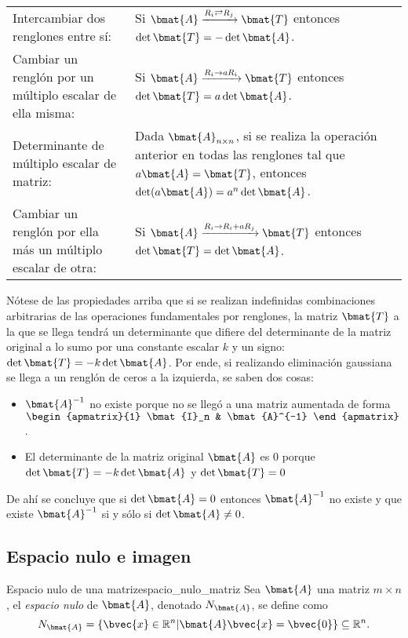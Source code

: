 \documentclass{fmbnotes}
\begin{document}
\begin{tabular}{p{}p{}}
	\rule[1ex]{0pt}{2.5ex}Intercambiar dos renglones entre sí: & Si \(\bmat{A}\xrightarrow{R_i \rightleftarrows R_j}\bmat{T}\) entonces \(\det \bmat{T}=-\det \bmat{A}\).\\
	\rule[1ex]{0pt}{2.5ex}Cambiar un renglón por un múltiplo escalar de ella misma: &  Si \(\bmat{A}\xrightarrow{R_i \to aR_i}\bmat{T}\) entonces \(\det \bmat{T}=a\det \bmat{A}\).  \\
	\rule[1ex]{0pt}{2.5ex}Determinante de múltiplo escalar de matriz: &  Dada \(\bmat{A}_{n \times n}\), si se realiza la operación anterior en todas las renglones tal que \(a\bmat{A}=\bmat{T}\), entonces \(\det (a\bmat{A})=a^{n} \det \bmat{A}\).  \\
	\rule[1ex]{0pt}{2.5ex}Cambiar un renglón por ella más un múltiplo escalar de otra: &  Si \(\bmat{A}\xrightarrow{R_i \to R_i+aR_j}\bmat{T}\) entonces \(\det \bmat{T}=\det \bmat{A}\). \\
\end{tabular}


Nótese de las propiedades arriba que si se realizan indefinidas combinaciones arbitrarias de las operaciones fundamentales por renglones, la matriz \(\bmat{T}\) a la que se llega tendrá un determinante que difiere del determinante de la matriz original a lo sumo por una constante escalar \(k\) y un signo: \(\det \bmat{T} = -k \det \bmat{A}\). Por ende, si realizando eliminación gaussiana se llega a un renglón de ceros a la izquierda, se saben dos cosas:
\begin{itemize}
\item \(\bmat{A}^{-1}\) no existe porque no se llegó a una matriz aumentada de forma \(\begin{apmatrix}{1}
 \bmat{I}_n & \bmat{A}^{-1}
\end{apmatrix}\).
\item El determinante de la matriz original \( \bmat{A} \) es 0 porque \(\det \bmat{T} = -k \det \bmat{A}\) y \(\det \bmat{T}=0\)
\end{itemize} 
De ahí se concluye que si \(\det \bmat{A}=0\) entonces \(\bmat{A}^{-1}\) no existe y que existe \(\bmat{A}^{-1}\) si y sólo si \(\det \bmat{A} \neq 0\).

\subsection{Espacio nulo e imagen}

\begin{definicion}{Espacio nulo de una matriz}{espacio_nulo_matriz}
	Sea \(\bmat{A}\) una matriz \(m \times n \), el \emph{espacio nulo} de \(\bmat{A}\), denotado \(N_{\bmat{A}}\), se define como
	\[N_{\bmat{A}}=\{\bvec{x}\in\mathbb{R}^{n}|\bmat{A}\bvec{x}=\bvec{0}\} \subseteq \mathbb{R}^{n}.\]
\end{definicion}
\end{document}
